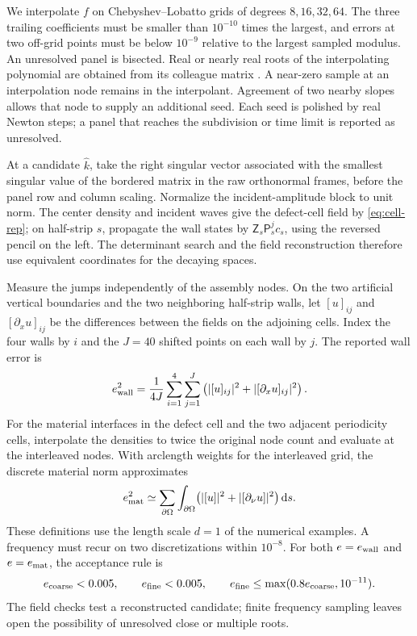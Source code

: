 We interpolate $f$ on Chebyshev--Lobatto grids of degrees $8,16,32,64$.
The three trailing coefficients must be smaller than $10^{-10}$ times
the largest, and errors at two off-grid points must be below $10^{-9}$
relative to the largest sampled modulus. An unresolved panel is bisected.
Real or nearly real roots of the interpolating polynomial are obtained
from its colleague matrix \cite{Boyd2002,ZhaoBarnett2015}. A near-zero
sample at an interpolation node remains in the interpolant. Agreement
of two nearby slopes allows that node to supply an additional seed.
Each seed is polished by real Newton steps; a panel that reaches the
subdivision or time limit is reported as unresolved.

At a candidate $\widehat k$, take the right singular vector associated
with the smallest singular value of the bordered matrix in the raw
orthonormal frames, before the panel row and column scaling. Normalize
the incident-amplitude block to unit norm. The center density and incident
waves give the defect-cell field by \eqref{eq:cell-rep}; on half-strip
$s$, propagate the wall states by $\mathsf Z_s\mathsf P_s^j c_s$,
using the reversed pencil on the left. The determinant search and the
field reconstruction therefore use equivalent coordinates for the
decaying spaces.

Measure the jumps independently of the assembly nodes. On the two
artificial vertical boundaries and the two neighboring half-strip walls,
let $[u]_{ij}$ and $[\partial_xu]_{ij}$ be the differences between the
fields on the adjoining cells. Index the four walls by $i$ and the $J=40$
shifted points on each wall by $j$. The reported wall error is
\[
 e_{\rm wall}^2=\frac{1}{4J}\sum_{i=1}^4\sum_{j=1}^J
 \left(|[u]_{ij}|^2+|[\partial_xu]_{ij}|^2\right).
\]
For the material interfaces in the defect cell and the two adjacent
periodicity cells, interpolate the densities to twice the original
node count and evaluate at the interleaved nodes. With arclength weights
for the interleaved grid, the discrete material norm approximates
\[
 e_{\rm mat}^2\simeq\sum_{\partial\Omega}
 \int_{\partial\Omega}\!\left(|[u]|^2+|[\partial_\nu u]|^2\right)\mathrm{d} s .
\]
These definitions use the length scale $d=1$ of the numerical examples.
A frequency must recur on two discretizations within $10^{-8}$. For
both $e=e_{\rm wall}$ and $e=e_{\rm mat}$, the acceptance rule is
\[
 e_{\rm coarse}<0.005,\qquad e_{\rm fine}<0.005,\qquad
 e_{\rm fine}\le\max(0.8e_{\rm coarse},10^{-11}).
\]
The field checks test a reconstructed candidate; finite
frequency sampling leaves open the possibility of unresolved close or
multiple roots.

